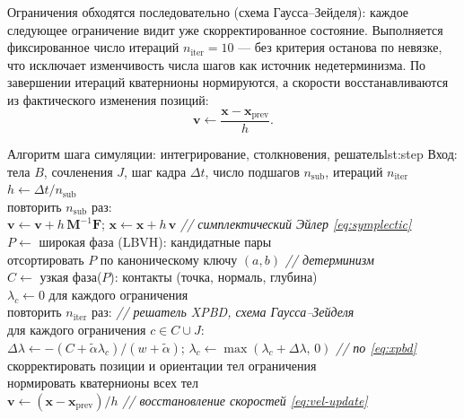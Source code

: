 Ограничения обходятся последовательно (схема Гаусса--Зейделя): каждое следующее
ограничение видит уже скорректированное состояние. Выполняется фиксированное
число итераций $n_{\text{iter}} = 10$ --- без критерия останова по невязке, что
исключает изменчивость числа шагов как источник недетерминизма. По завершении
итераций кватернионы нормируются, а скорости восстанавливаются из фактического
изменения позиций:
\begin{equation}
  \mathbf{v} \leftarrow \frac{\mathbf{x} - \mathbf{x}_{\text{prev}}}{h}.
  \label{eq:vel-update}
\end{equation}

\begin{pseudocode}{Алгоритм шага симуляции: интегрирование, столкновения,
  решатель}{lst:step}
 Вход: тела $B$, сочленения $J$, шаг кадра $\Delta t$,
       число подшагов $n_{\text{sub}}$, итераций $n_{\text{iter}}$\\
 $h \leftarrow \Delta t / n_{\text{sub}}$\\
 повторить $n_{\text{sub}}$ раз:\\
 $\mathbf{v} \leftarrow \mathbf{v} + h\,\mathbf{M}^{-1}\mathbf{F}$;\quad
       $\mathbf{x} \leftarrow \mathbf{x} + h\,\mathbf{v}$
       \quad\textit{// симплектический Эйлер \eqref{eq:symplectic}}\\
 $P \leftarrow$ широкая фаза (LBVH): кандидатные пары\\
 отсортировать $P$ по каноническому ключу $(a, b)$
       \quad\textit{// детерминизм}\\
 $C \leftarrow$ узкая фаза($P$): контакты (точка, нормаль, глубина)\\
 $\lambda_c \leftarrow 0$ для каждого ограничения\\
 повторить $n_{\text{iter}}$ раз:
       \quad\textit{// решатель XPBD, схема Гаусса--Зейделя}\\
 для каждого ограничения $c \in C \cup J$:\\
 $\Delta\lambda \leftarrow -(C + \tilde{\alpha}\lambda_c) /
       (w + \tilde{\alpha})$;\quad
       $\lambda_c \leftarrow \max(\lambda_c + \Delta\lambda,\,0)$
       \quad\textit{// по \eqref{eq:xpbd}}\\
 скорректировать позиции и ориентации тел ограничения\\
 нормировать кватернионы всех тел\\
 $\mathbf{v} \leftarrow (\mathbf{x} - \mathbf{x}_{\text{prev}}) / h$
       \quad\textit{// восстановление скоростей \eqref{eq:vel-update}}
\end{pseudocode}

